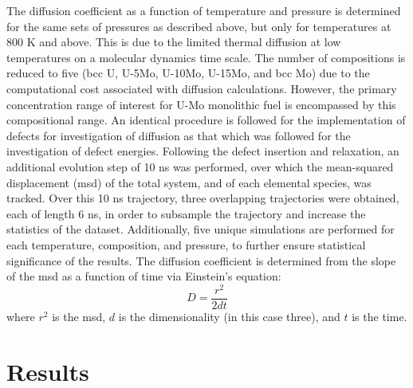 \documentclass[default]{sn-jnl}%
\begin{document}
The diffusion coefficient as a function of temperature and pressure is determined for the same sets of pressures as described above, but only for temperatures at 800 K and above. This is due to the limited thermal diffusion at low temperatures on a molecular dynamics time scale. The number of compositions is reduced to five (bcc U, U-5Mo, U-10Mo, U-15Mo, and bcc Mo) due to the computational cost associated with diffusion calculations. However, the primary concentration range of interest for U-Mo monolithic fuel is encompassed by this compositional range. An identical procedure is followed for the implementation of defects for investigation of diffusion as that which was followed for the investigation of defect energies. Following the defect insertion and relaxation, an additional evolution step of 10 ns was performed, over which the mean-squared displacement (msd) of the total system, and of each elemental species, was tracked. Over this 10 ns trajectory, three overlapping trajectories were obtained, each of length 6 ns, in order to subsample the trajectory and increase the statistics of the dataset. Additionally, five unique simulations are performed for each temperature, composition, and pressure, to further ensure statistical significance of the results. The diffusion coefficient is determined from the slope of the msd as a function of time via Einstein's equation:
\begin{equation}
D = \frac{r^2}{2dt} 
\end{equation}
\noindent where $r^2$ is the msd, $d$ is the dimensionality (in this case three), and $t$ is the time. 

\section{Results}\label{sec3}
\end{document}
